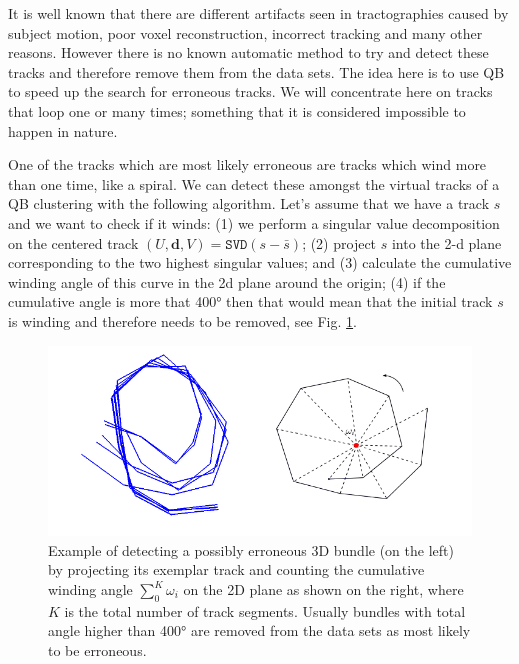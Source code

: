\documentclass[preprint,authoryear,a4paper,10pt,onecolumn]{elsarticle}
\begin{document}
It is well known that there are different artifacts seen in
tractographies caused by subject motion, poor voxel reconstruction,
incorrect tracking and many other reasons. However there is no known
automatic method to try and detect these tracks and therefore remove
them from the data sets. The idea here is to use QB to speed up the
search for erroneous tracks. We will concentrate here on tracks that
loop one or many times; something that it is considered impossible to
happen in nature.

One of the tracks which are most likely erroneous are tracks which wind
more than one time, like a spiral. We can detect these amongst the
virtual tracks of a QB clustering with the following algorithm. Let's
assume that we have a track $s$ and we want to check if it winds: (1) we
perform a singular value decomposition on the centered track
$(U,\mathbf{d},V)=\mathtt{SVD}(s-\bar{s})$; (2) project $s$ into the 2-d
plane corresponding to the two highest singular values; and (3)
calculate the cumulative winding angle of this curve in the 2d plane
around the origin; (4) if the cumulative angle is more that
\ang{400} then that would mean that the initial track $s$ is winding
and therefore needs to be removed, see Fig. \ref{Flo:winding}.

\begin{figure}
\begin{centering}
\includegraphics[scale=0.5]{last_figures/winding}
\par\end{centering}
\caption{Example of detecting a possibly erroneous 3D bundle (on the
  left) by projecting its exemplar track and counting the cumulative
  winding angle $\sum_{0}^{K}\omega_{i}$ on the 2D plane as shown on the
  right, where $K$ is the total number of track segments. Usually
  bundles with total angle higher than \ang{400} are removed from the
  data sets as most likely to be erroneous.\label{Flo:winding}}
\end{figure}
\end{document}
